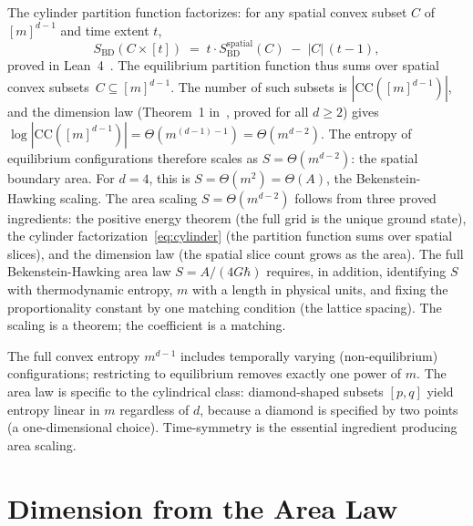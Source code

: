 \documentclass[aps,prl,twocolumn,superscriptaddress]{revtex4-2}
\begin{document}
The cylinder partition function factorizes: for any spatial convex
subset $C$ of $[m]^{d-1}$ and time extent $t$,
\begin{equation}
\label{eq:cylinder}
S_{\mathrm{BD}}(C \times [t]) \;=\; t \cdot S_{\mathrm{BD}}^{\mathrm{spatial}}(C) \;-\; |C|\,(t-1),
\end{equation}
proved in Lean~4~\cite{leanrepo}. The equilibrium partition function
thus sums over spatial convex subsets~$C \subseteq [m]^{d-1}$.
The number of such subsets is $|\mathrm{CC}([m]^{d-1})|$, and the
dimension law (Theorem~1 in~\cite{DiFiorePaper2}, proved for all
$d \geq 2$) gives
$\log|\mathrm{CC}([m]^{d-1})| = \Theta(m^{(d-1)-1}) = \Theta(m^{d-2})$.
The entropy of equilibrium configurations therefore scales as
$S = \Theta(m^{d-2})$: the spatial boundary area. For $d = 4$, this
is $S = \Theta(m^2) = \Theta(A)$, the Bekenstein-Hawking scaling.
The area scaling $S = \Theta(m^{d-2})$ follows from three proved
ingredients: the positive
energy theorem (the full grid is the unique ground state), the
cylinder factorization~\eqref{eq:cylinder} (the partition function
sums over spatial slices), and the dimension law (the spatial slice
count grows as the area). The full Bekenstein-Hawking area law
$S = A/(4G\hbar)$ requires, in addition, identifying $S$ with
thermodynamic entropy, $m$ with a length in physical units, and
fixing the proportionality constant by one matching condition
(the lattice spacing). The scaling is a theorem; the coefficient
is a matching.

The full convex entropy $m^{d-1}$ includes temporally varying
(non-equilibrium) configurations; restricting to equilibrium removes
exactly one power of $m$. The area law is specific to the cylindrical
class: diamond-shaped subsets $[p,q]$ yield entropy linear in $m$
regardless of $d$, because a diamond is specified by two points (a
one-dimensional choice). Time-symmetry is the essential ingredient
producing area scaling.

\section{Dimension from the Area Law}\label{sec:dimuniq}
\end{document}
